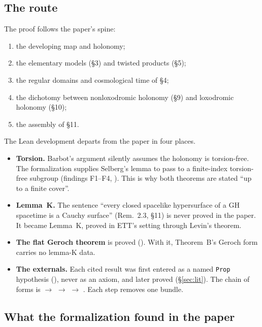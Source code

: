 \subsection{The route}

The proof follows the paper's spine:
\begin{enumerate}
\item the developing map and holonomy;
\item the elementary models (§3) and twisted products (§5);
\item the regular domains and cosmological time of §4;
\item the dichotomy between nonloxodromic holonomy (§9) and loxodromic holonomy (§10);
\item the assembly of §11.
\end{enumerate}

The Lean development departs from the paper in four places.
\begin{itemize}
\item \textbf{Torsion.} Barbot's argument silently assumes the holonomy is torsion-free. The
  formalization supplies Selberg's lemma to pass to a finite-index torsion-free subgroup (findings
  F1--F4, ). This is why both theorems are stated ``up to a finite cover''.
\item \textbf{Lemma~K.} The sentence ``every closed spacelike hypersurface of a GH spacetime is a
  Cauchy surface'' (Rem.~2.3, §11) is never proved in the paper. It became Lemma~K, proved in
  ETT's setting through Levin's theorem.
\item \textbf{The flat Geroch theorem} is proved (). With it, Theorem~B's Geroch form
  carries no lemma-K data.
\item \textbf{The externals.} Each cited result was first entered as a named \texttt{Prop}
  hypothesis (), never as an axiom, and later proved (\S\ref{sec:lit}). The chain of
  forms is  $\to$  $\to$  $\to$ .
  Each step removes one bundle.
\end{itemize}

\subsection{What the formalization found in the paper}

